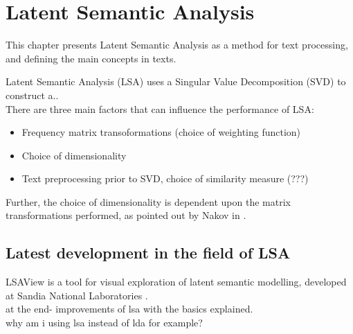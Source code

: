\chapter{Latent Semantic Analysis}
\label{sec:lsa}

\begin{summary}
This chapter presents Latent Semantic Analysis as a method for text processing, and defining the main concepts in texts.
\end{summary}

Latent Semantic Analysis (LSA) uses a Singular Value Decomposition (SVD) to construct a..\\

There are three main factors that can influence the performance of LSA\cite{Nakov_weightfunctions}\cite{NakovBetterResultsLSI}:\\
\begin{itemize}
\item Frequency matrix transoformations (choice of weighting function)
\item Choice of dimensionality
\item Text preprocessing prior to SVD, choice of similarity measure (???)
\end{itemize}

Further, the choice of dimensionality is dependent upon the matrix transformations performed, as pointed out by Nakov in \cite{NakovBetterResultsLSI}.\\

\section{Latest development in the field of LSA}
LSAView is a tool for visual exploration of latent semantic modelling, developed at Sandia National Laboratories \cite{CrDuSh09}.\\

at the end- improvements of lsa with the basics explained.\\
why am i using lsa instead of lda for example?\\
